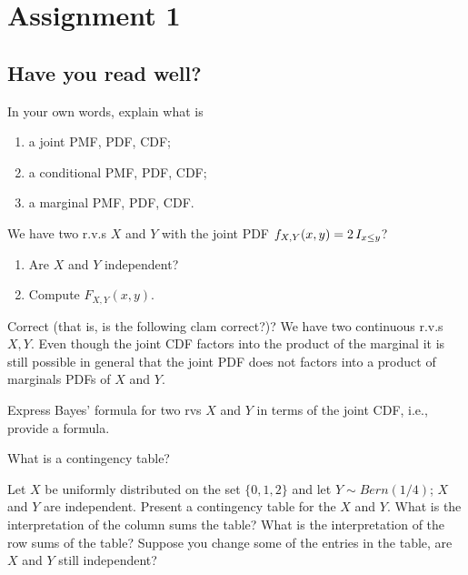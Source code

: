 \documentclass[assignments]{subfiles}
\begin{document}
\section{Assignment 1}
\label{sec:org9cbca82}


\subsection{Have you read well?}
\label{sec:have-you-read}


\begin{exercise}
In your own words, explain what is
\begin{enumerate}
\item a joint PMF, PDF, CDF;
\item a conditional PMF, PDF, CDF;
\item a marginal PMF, PDF, CDF.
\end{enumerate}
\end{exercise}


\begin{exercise}
We have two r.v.s $X$ and $Y$ with the joint PDF $f_{X,Y}(x,y) = 2 \,I_{x\leq y}$? 
\begin{enumerate}
\item Are $X$ and $Y$ independent? 
\item Compute $F_{X,Y}(x,y)$. 
\end{enumerate}
\end{exercise}

\begin{exercise}
Correct (that is, is the following clam correct?)? We have two continuous r.v.s $X, Y$. Even though the joint CDF factors into the product of the marginal it is still possible in general that the joint PDF does not factors into a product of marginals PDFs of $X$ and $Y$.
\end{exercise}

\begin{exercise}
Express Bayes' formula for two rvs $X$ and $Y$ in terms of the joint CDF, i.e., provide a formula.
\end{exercise}

\begin{exercise}
What is a contingency table?
\end{exercise}

\begin{exercise}
Let $X$ be uniformly distributed on the set $\{0,1,2\}$ and let $Y \sim Bern(1/4)$; $X$ and $Y$ are independent.
Present a contingency table for the $X$ and $Y$.
What is the interpretation of the column sums the table?
What is the interpretation of the row sums of the table? Suppose you change some of the entries in the table, are $X$ and $Y$ still independent?
\end{exercise}
\end{document}
